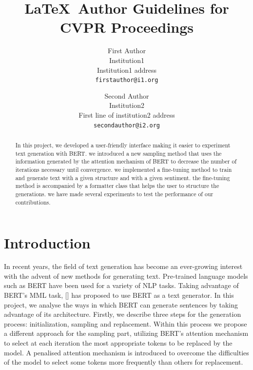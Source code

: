 \documentclass[10pt,twocolumn,letterpaper]{article}
\begin{document}
\title{\LaTeX\ Author Guidelines for CVPR Proceedings}

\author{First Author\\
Institution1\\
Institution1 address\\
{\tt\small firstauthor@i1.org}
\and
Second Author\\
Institution2\\
First line of institution2 address\\
{\tt\small secondauthor@i2.org}
}

\maketitle

\begin{abstract}
In this project, we developed a user-friendly interface making it easier
to experiment text generation with BERT. we introduced a new sampling method
that uses the information generated by the attention mechanism of BERT to decrease
the number of iterations necessary until convergence. we implemented a fine-tuning
method to train and generate text with a given structure and with a given sentiment.
the fine-tuning method is accompanied by a formatter class that helps the user to
structure the generations. we have made several experiments to test the performance of
our contributions.
\end{abstract}

\section{Introduction}

In recent years, the field of text generation has become an ever-growing interest
with the advent of new methods for generating text. Pre-trained language models
such as BERT have been used for a variety of NLP tasks. Taking advantage of BERT’s
MML task, [] has proposed to use BERT as a text generator. In this project,
we analyse the ways in which BERT can generate sentences by taking advantage of its
architecture. Firstly, we describe three steps for the generation process: initialization,
sampling and replacement. Within this process we propose a different approach for the
sampling part, utilizing BERT’s attention mechanism to select at each iteration the most
appropriate tokens to be replaced by the model. A penalised attention mechanism is
introduced to overcome the difficulties of the model to select some tokens more frequently
than others for replacement.
\end{document}
